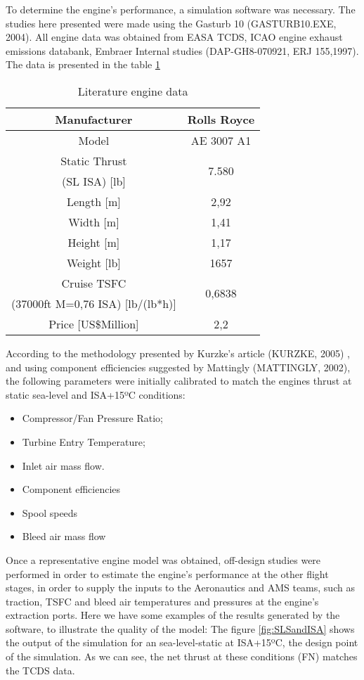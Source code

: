 ﻿To determine the engine's performance, a simulation software was necessary. The studies here presented were made using the Gasturb 10 (GASTURB10.EXE, 2004).
All engine data was obtained from EASA TCDS, ICAO engine exhaust emissions databank, Embraer Internal studies (DAP-GH8-070921, ERJ 155,1997).
The data is presented in the table \ref{tab:enginedata}

\begin{table}[htbp]
  \centering
  \caption{Literature engine data}
    \begin{tabular}{cc}
    \toprule
    Manufacturer & Rolls Royce \\
    \midrule
    Model & AE 3007 A1 \\
    Static Thrust & \multirow{2}[2]{*}{7.580} \\
    (SL ISA) [lb] &  \\
    Length [m] & 2,92 \\
    Width [m] & 1,41 \\
    Height [m] & 1,17 \\
    Weight [lb] & 1657 \\
    Cruise TSFC & \multirow{2}[2]{*}{0,6838} \\
    (37000ft M=0,76 ISA)  [lb/(lb*h)] &  \\
    Price [US\$Million] & 2,2 \\
    \bottomrule
    \end{tabular}%
  \label{tab:enginedata}%
\end{table}%

According to the methodology presented by Kurzke's article (KURZKE, 2005) , and using component efficiencies suggested by Mattingly (MATTINGLY, 2002), the following parameters were initially calibrated to match the engines thrust at static sea-level and ISA+15ºC conditions:

\begin{itemize}
\item Compressor/Fan Pressure Ratio;
\item Turbine Entry Temperature;
\item Inlet air mass flow.
\item Component efficiencies
\item Spool speeds
\item Bleed air mass flow
\end{itemize}


Once a representative engine model was obtained, off-design studies were performed in order to estimate the engine's performance at the other flight stages, in order to supply the inputs to the Aeronautics and AMS teams, such as traction, TSFC and bleed air temperatures and pressures at the engine's extraction ports.
Here we have some examples of the results generated by the software, to illustrate the quality of the model:
The figure \ref{fig:SLSandISA} shows the output of the simulation for an sea-level-static at ISA+15ºC, the design point of the simulation. As we can see, the net thrust at these conditions (FN) matches the TCDS data.

